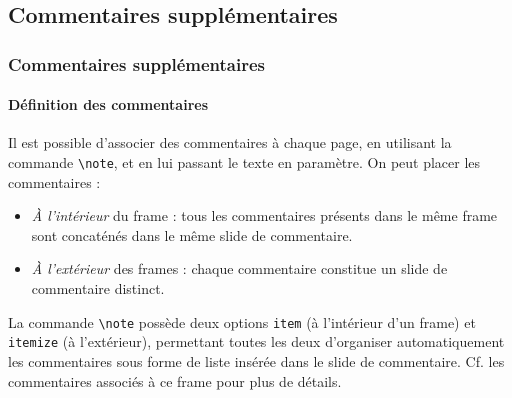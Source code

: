\documentclass[10pt,    %
    french,             %
    xcolor=table,       %
    envcountsect        %
]{beamer}
\begin{document}
\subsection{Commentaires supplémentaires}
\begin{frame}
    \frametitle{Commentaires supplémentaires}
    \framesubtitle{Définition des commentaires}
    
    Il est possible d'associer des commentaires à chaque page, en utilisant la commande \texttt{\textbackslash{}note}, et en lui passant le texte en paramètre. On peut placer les commentaires :
    \begin{itemize}
        \item \textit{À l'intérieur} du frame : tous les commentaires présents dans le même frame sont concaténés dans le même slide de commentaire.
        \item \textit{À l'extérieur} des frames : chaque commentaire constitue un slide de commentaire distinct.
    \end{itemize}
    
    \vspace{0.25cm}
    La commande \texttt{\textbackslash{}note} possède deux options \texttt{item} (à l'intérieur d'un frame) et \texttt{itemize} (à l'extérieur), permettant toutes les deux d'organiser automatiquement les commentaires sous forme de liste insérée dans le slide de commentaire. Cf. les commentaires associés à ce frame pour plus de détails.
\end{frame}
\end{document}
